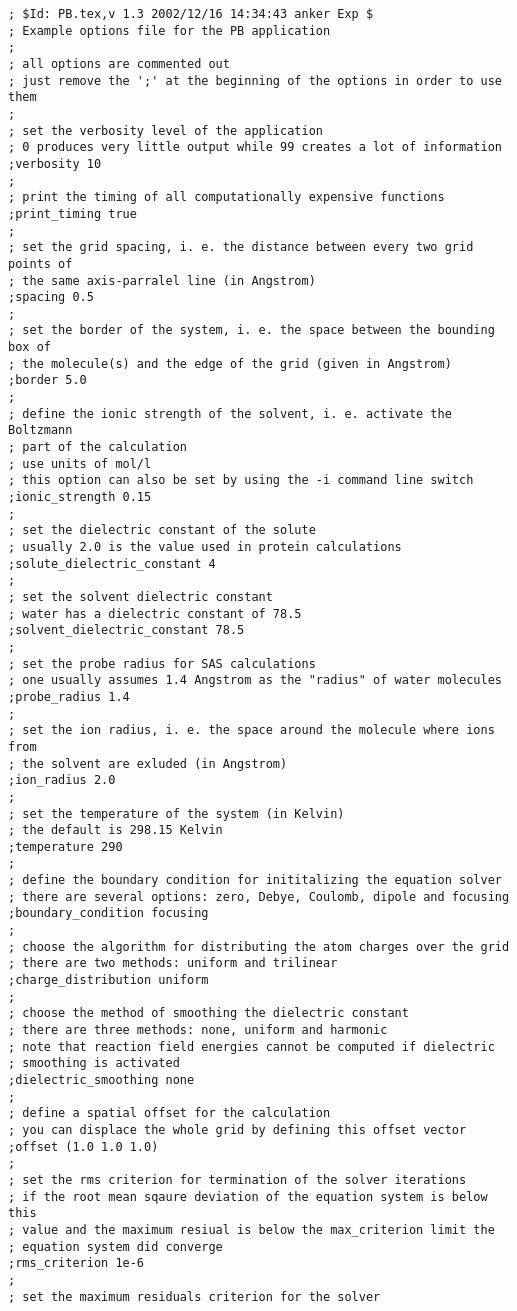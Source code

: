 \documentclass[12pt,twoside,a4paper]{article}
\begin{document}
\scriptsize
\begin{verbatim}
; $Id: PB.tex,v 1.3 2002/12/16 14:34:43 anker Exp $
; Example options file for the PB application
;
; all options are commented out
; just remove the ';' at the beginning of the options in order to use them
;
; set the verbosity level of the application 
; 0 produces very little output while 99 creates a lot of information
;verbosity 10 
;
; print the timing of all computationally expensive functions
;print_timing true
;
; set the grid spacing, i. e. the distance between every two grid points of
; the same axis-parralel line (in Angstrom)
;spacing 0.5
;
; set the border of the system, i. e. the space between the bounding box of
; the molecule(s) and the edge of the grid (given in Angstrom)
;border 5.0
;
; define the ionic strength of the solvent, i. e. activate the Boltzmann
; part of the calculation
; use units of mol/l
; this option can also be set by using the -i command line switch
;ionic_strength 0.15
;
; set the dielectric constant of the solute
; usually 2.0 is the value used in protein calculations
;solute_dielectric_constant 4
;
; set the solvent dielectric constant
; water has a dielectric constant of 78.5
;solvent_dielectric_constant 78.5
;
; set the probe radius for SAS calculations
; one usually assumes 1.4 Angstrom as the "radius" of water molecules
;probe_radius 1.4
;
; set the ion radius, i. e. the space around the molecule where ions from
; the solvent are exluded (in Angstrom)
;ion_radius 2.0
;
; set the temperature of the system (in Kelvin)
; the default is 298.15 Kelvin
;temperature 290
;
; define the boundary condition for inititalizing the equation solver
; there are several options: zero, Debye, Coulomb, dipole and focusing
;boundary_condition focusing
;
; choose the algorithm for distributing the atom charges over the grid
; there are two methods: uniform and trilinear
;charge_distribution uniform
;
; choose the method of smoothing the dielectric constant
; there are three methods: none, uniform and harmonic
; note that reaction field energies cannot be computed if dielectric
; smoothing is activated
;dielectric_smoothing none
;
; define a spatial offset for the calculation
; you can displace the whole grid by defining this offset vector
;offset (1.0 1.0 1.0)
;
; set the rms criterion for termination of the solver iterations
; if the root mean sqaure deviation of the equation system is below this
; value and the maximum resiual is below the max_criterion limit the
; equation system did converge
;rms_criterion 1e-6
;
; set the maximum residuals criterion for the solver

\end{verbatim}
\end{document}
